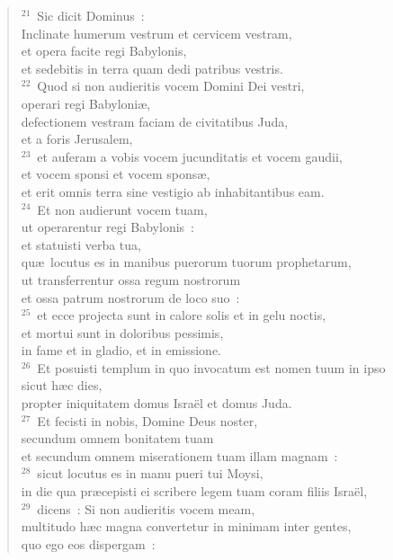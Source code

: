 \begin{verse}
${}^{21}$~Sic dicit Dominus~:\\ Inclinate humerum vestrum et cervicem vestram,\\ et opera facite regi Babylonis,\\ et sedebitis in terra quam dedi patribus vestris.\\
${}^{22}$~Quod si non audieritis vocem Domini Dei vestri,\\ operari regi Babyloni\ae ,\\ defectionem vestram faciam de civitatibus Juda,\\ et a foris Jerusalem,\\
${}^{23}$~et auferam a vobis vocem jucunditatis et vocem gaudii,\\ et vocem sponsi et vocem spons\ae ,\\ et erit omnis terra sine vestigio ab inhabitantibus eam.\\
${}^{24}$~Et non audierunt vocem tuam,\\ ut operarentur regi Babylonis~:\\ et statuisti verba tua,\\ qu\ae\ locutus es in manibus puerorum tuorum prophetarum,\\ ut transferrentur ossa regum nostrorum\\ et ossa patrum nostrorum de loco suo~:\\
${}^{25}$~et ecce projecta sunt in calore solis et in gelu noctis,\\ et mortui sunt in doloribus pessimis,\\ in fame et in gladio, et in emissione.\\
${}^{26}$~Et posuisti templum in quo invocatum est nomen tuum in ipso\\ sicut h\ae c dies,\\ propter iniquitatem domus Isra\"el et domus Juda.\\
${}^{27}$~Et fecisti in nobis, Domine Deus noster,\\ secundum omnem bonitatem tuam\\ et secundum omnem miserationem tuam illam magnam~:\\
${}^{28}$~sicut locutus es in manu pueri tui Moysi,\\ in die qua pr\ae cepisti ei scribere legem tuam coram filiis Isra\"el,\\
${}^{29}$~dicens~: Si non audieritis vocem meam,\\ multitudo h\ae c magna convertetur in minimam inter gentes,\\ quo ego eos dispergam~:\\

\end{verse}
